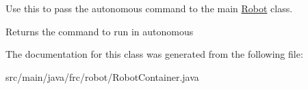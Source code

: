 Use this to pass the autonomous command to the main \mbox{\hyperlink{classfrc_1_1robot_1_1_robot}{Robot}} class.

\begin{DoxyReturn}{Returns}
the command to run in autonomous 
\end{DoxyReturn}


The documentation for this class was generated from the following file\+:\begin{DoxyCompactItemize}
\item 
src/main/java/frc/robot/Robot\+Container.\+java\end{DoxyCompactItemize}

